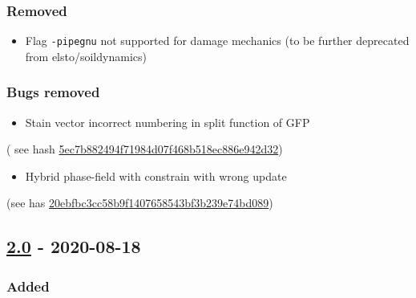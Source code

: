\subsubsection{Removed}\label{removed}

\begin{itemize}
\tightlist
\item
  Flag \lstinline!-pipegnu! not supported for damage mechanics (to be
  further deprecated from elsto/soildynamics)
\end{itemize}

\subsubsection{Bugs removed}\label{bugs-removed}

\begin{itemize}
\tightlist
\item
  Stain vector incorrect numbering in split function of GFP
\end{itemize}

( see hash
\href{https://codev-tuleap.intra.cea.fr/plugins/git/hpcseism/freefem?a=commit\&h=5ec7b882494f71984d07f468b518ec886e942d32}{5ec7b882494f71984d07f468b518ec886e942d32})

\begin{itemize}
\tightlist
\item
  Hybrid phase-field with constrain with wrong update
\end{itemize}

(see has
\href{https://codev-tuleap.intra.cea.fr/plugins/git/hpcseism/freefem?a=commit\&h=20ebfbc3cc58b9f1407658543bf3b239e74bd089}{20ebfbc3cc58b9f1407658543bf3b239e74bd089})

\subsection{\texorpdfstring{\href{https://gitlab.com/PsdSolver/psd_sources/-/tree/v2.0}{2.0}
- 2020-08-18}{2.0 - 2020-08-18}}\label{section-2}

\subsubsection{Added}\label{added-3}


